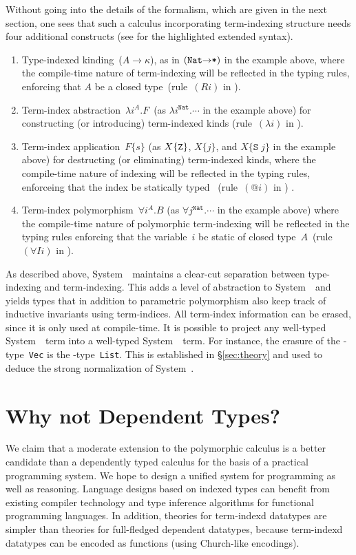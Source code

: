 Without going into the details of the formalism, which are given in the
next section, one sees that such a calculus incorporating term-indexing
structure needs four additional constructs (see  for the
highlighted extended syntax).
\begin{enumerate}
\item 
  Type-indexed kinding~($A\to\kappa$), as in $(\texttt{{Nat}\ensuremath{\to}*})$
  in the example above, where the compile-time nature of term-indexing
  will be reflected in the typing rules, enforcing that $A$ be a closed
  type~(rule~$(Ri)$ in ).

\item 
  Term-index abstraction~$\lambda i^A.F$~(as $\lambda
  i^{\texttt{{Nat}}}.\cdots$ in the example above) for constructing (or
  introducing) term-indexed kinds (rule~$(\lambda i)$ in
  ).  

\item 
  Term-index application~$F\{s\}$ (as $X\{{\tt Z}\}$, $X\{j\}$, and
  $X\{\texttt{S}\;j\}$ in the example above) for destructing (or
  eliminating) term-indexed kinds, where the compile-time nature of
  indexing will be reflected in the typing rules, enforceing that the index be
  statically typed%
~(rule~$(@i)$ in ) .

\item 
  Term-index polymorphism~$\forall i^A.B$ (as $\forall
  j^{\texttt{{Nat}}}.\cdots$ in the example above) where the compile-time
  nature of polymorphic term-indexing will be reflected in the typing rules enforcing
  that the variable~$i$ be static of closed type~$A$~(rule~$(\forall
  Ii)$ in ).
\end{enumerate}

As described above, System~\Fi\ maintains a clear-cut separation between
type-indexing and term-indexing.  This adds a level of abstraction
to System~\Fw\ and yields types that in addition to parametric polymorphism
also keep track of inductive invariants using term-indices. All term-index
information can be erased, since it is only used at compile-time.  
It is possible to project any well-typed System~\Fi\ term into a well-typed System~\Fw\ term.
For instance, the erasure of the \Fi-type~\texttt{Vec}
is the \Fw-type~\texttt{List}.  This is established in
\S\ref{sec:theory} and used to deduce the strong normalization of
System~\Fi.


\section{Why not Dependent Types?}
We claim that a moderate extension to the polymorphic calculus is a better candidate
than a dependently typed calculus for the basis of
a practical programming system. We hope to design
a unified system for programming as well as reasoning.
Language designs based on indexed types can benefit from
existing compiler technology and type inference algorithms for
functional programming languages. In addition, theories for
term-indexd datatypes are simpler than theories for full-fledged
dependent datatypes, because term-indexd datatypes can be encoded
as functions (using Church-like encodings).

